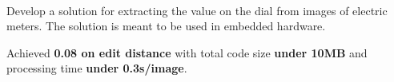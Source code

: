 \\
\begin{zitemize}
    \item Develop a solution for extracting the value on the dial from images of electric meters. The solution is meant to be used in embedded hardware.
    \item Achieved \textbf{0.08 on edit distance} with total code size
    \textbf{under 10MB} and processing time \textbf{under 0.3s/image}.
\end{zitemize}



